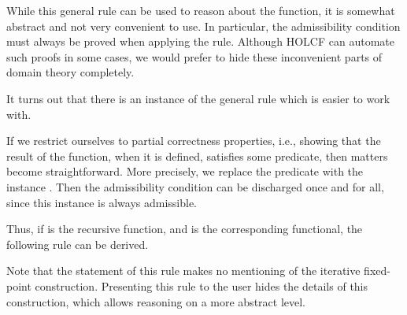 \documentclass[copyright,creativecommons,sharealike]{eptcs}
\theoremstyle{remark}
\begin{document}
\begin{isabellebody}
\begin{isamarkuptext}
  While this general rule can be used to reason about the 
  function, it is somewhat abstract and not very convenient to
  use. In particular, the admissibility condition must always be proved when applying the
  rule. Although HOLCF can automate such proofs in some cases,
  we would prefer to hide these inconvenient parts of domain theory completely.\end{isamarkuptext}\isamarkuptrue {}
\isamarkuptrue \begin{isamarkuptext}It turns out that there is an instance of the general rule 
which is easier to work with. 

If we restrict ourselves to partial correctness properties, i.e.,
showing that the result of the function, when it is defined, satisfies
some predicate, then matters become straightforward.  More precisely,
we replace the predicate  with the instance . Then the admissibility condition can be discharged once
and for all, since this instance is always admissible.

Thus, if  is the recursive function, and  is the
corresponding functional, the following rule can be derived.
\begin{center}\mbox{}
\end{center}

Note that the statement of this rule makes no mentioning of the
iterative fixed-point construction. Presenting this rule to the user
hides the details of this construction, which allows reasoning on a
more abstract level.


\end{isamarkuptext}
\end{isabellebody}
\end{document}
